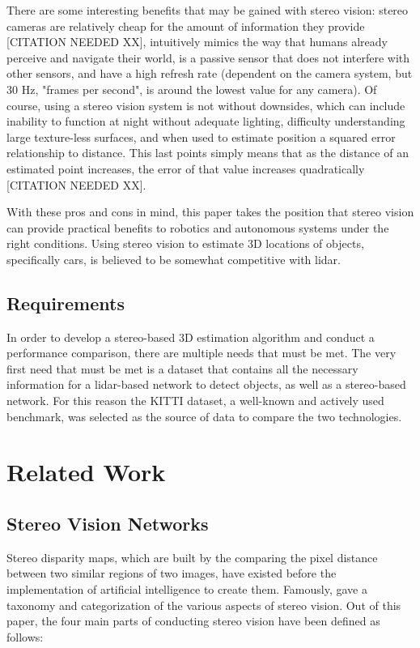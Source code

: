 There are some interesting benefits that may be gained with stereo vision: stereo cameras are relatively cheap for the amount of information they provide [CITATION NEEDED XX], intuitively mimics the way that humans already perceive and navigate their world, is a passive sensor that does not interfere with other sensors, and have a high refresh rate (dependent on the camera system, but 30 Hz, "frames per second", is around the lowest value for any camera). Of course, using a stereo vision system is not without downsides, which can include inability to function at night without adequate lighting, difficulty understanding large texture-less surfaces, and when used to estimate position a squared error relationship to distance. This last points simply means that as the distance of an estimated point increases, the error of that value increases quadratically [CITATION NEEDED XX]. 

With these pros and cons in mind, this paper takes the position that stereo vision can provide practical benefits to robotics and autonomous systems under the right conditions. Using stereo vision to estimate 3D locations of objects, specifically cars, is believed to be somewhat competitive with lidar.


\subsection{Requirements}
In order to develop a stereo-based 3D estimation algorithm and conduct a performance comparison, there are multiple needs that must be met. The very first need that must be met is a dataset that contains all the necessary information for a lidar-based network to detect objects, as well as a stereo-based network. For this reason the KITTI dataset, a well-known and actively used benchmark, was selected as the source of data to compare the two technologies.

\section{Related Work}
\subsection{Stereo Vision Networks}
Stereo disparity maps, which are built by the comparing the pixel distance between two similar regions of two images, have existed before the implementation of artificial intelligence to create them. Famously, \cite{scharstein_taxonomy_2002} gave a taxonomy and categorization of the various aspects of stereo vision. Out of this paper, the four main parts of conducting stereo vision have been defined as follows: 

